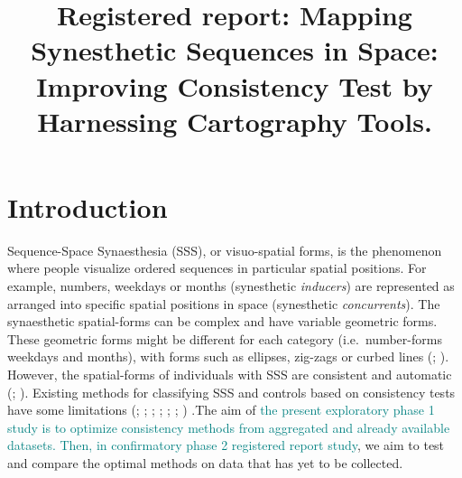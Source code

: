 \documentclass[
  man,
  floatsintext,
  longtable,
  a4paper,
  nolmodern,
  notxfonts,
  notimes,
  colorlinks=true,linkcolor=blue,citecolor=blue,urlcolor=blue]{apa7}
\title{Registered report: Mapping Synesthetic Sequences in Space:
Improving Consistency Test by Harnessing Cartography Tools.}
\affiliation{
{Psychology, UniDistance Suisse}}
\begin{document}
\maketitle



\setcounter{secnumdepth}{3}

\setlength\LTleft{0pt}

\resetlinenumber[1]



\section{Introduction}\label{sec-introduction}

Sequence-Space Synaesthesia (SSS), or visuo-spatial forms, is the
phenomenon where people visualize ordered sequences in particular
spatial positions. For example, numbers, weekdays or months (synesthetic
\emph{inducers}) are represented as arranged into specific spatial
positions in space (synesthetic \emph{concurrents}). The synaesthetic
spatial-forms can be complex and have variable geometric forms. These
geometric forms might be different for each category (i.e.~number-forms
weekdays and months), with forms such as ellipses, zig-zags or curbed
lines (;
). However, the spatial-forms of
individuals with SSS are consistent and automatic
(;
).
Existing methods for classifying SSS and controls based on consistency
tests have some limitations (; ;
;
;
;
; )
.The aim of
\textcolor{teal}{the present exploratory phase 1 study is to optimize consistency methods from aggregated and already available datasets. Then, in confirmatory phase 2 registered report study},
we aim to test and compare the optimal methods on data that has yet to
be collected.
\end{document}
